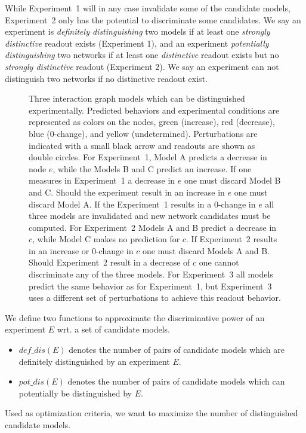 While Experiment~1 will in any case invalidate some of the candidate models,
Experiment~2 only has the potential to discriminate some candidates.
We say an experiment is \emph{definitely distinguishing} two models if at
least one \emph{strongly distinctive} readout exists (Experiment 1), and an experiment
 \emph{potentially distinguishing} two networks if at least one
 \emph{distinctive} readout exists but no \emph{strongly distinctive} readout (Experiment 2).
We say an experiment can not distinguish two networks if no distinctive readout exist.

\begin{figure*}[!t]
\begin{center}

\caption{
Three interaction graph models which can be distinguished experimentally.
Predicted behaviors and experimental conditions are represented as colors on
 the nodes, green (increase), red (decrease), blue (0-change), and yellow
 (undetermined).
Perturbations are indicated with a small black arrow and readouts are shown as
 double circles.
For Experiment~1, Model A predicts a decrease in node $e$, while the Models B
 and C predict an increase.
If one measures in Experiment~1 a decrease in $e$ one must discard Model B and C.
Should the experiment result in an increase in $e$ one must discard Model A.
If the Experiment~1 results in a 0-change in $e$ all three models are
 invalidated and new network candidates must be computed.
For Experiment~2 Models A and B predict a decrease in $c$, while Model C makes
 no prediction for $c$.
If Experiment~2 results in an increase or 0-change in $c$ one must discard
 Models A and B.
Should Experiment~2 result in a decrease of $c$ one cannot discriminate any
 of the three models.
%
For Experiment~3 all models predict the same behavior as for Experiment~1, but Experiment~3 uses a different set of perturbations to achieve this readout behavior.
}
\label{fig:experiment_example}
\end{center}
\end{figure*}


We define two functions to approximate the discriminative power
 of an experiment $E$ wrt. a set of candidate models.
\begin{itemize}
  \item
  $def\_dis(E)$ denotes the number of pairs of candidate models which are
   definitely distinguished by an experiment $E$.
  \item
  $pot\_dis(E)$ denotes the number of pairs of candidate models which can
   potentially be distinguished by $E$.
\end{itemize}
%
Used as optimization criteria, we want to maximize the number of distinguished
candidate models.



